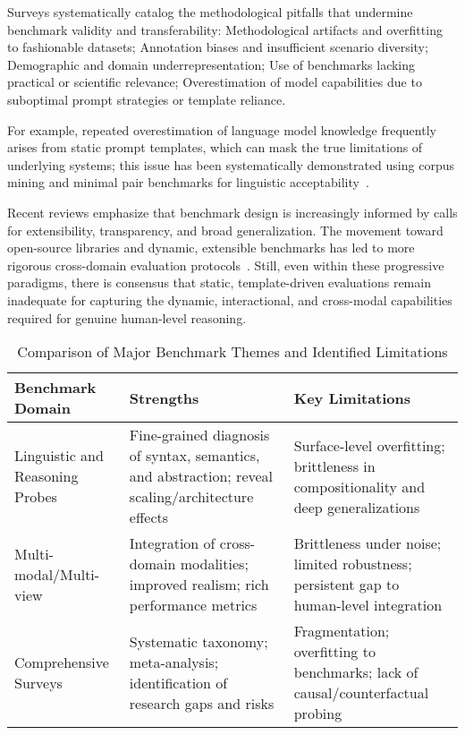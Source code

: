 \documentclass[sigconf]{acmart}
\begin{document}
Surveys systematically catalog the methodological pitfalls that undermine benchmark validity and transferability:
Methodological artifacts and overfitting to fashionable datasets;
Annotation biases and insufficient scenario diversity;
Demographic and domain underrepresentation;
Use of benchmarks lacking practical or scientific relevance;
Overestimation of model capabilities due to suboptimal prompt strategies or template reliance.

For example, repeated overestimation of language model knowledge frequently arises from static prompt templates, which can mask the true limitations of underlying systems; this issue has been systematically demonstrated using corpus mining and minimal pair benchmarks for linguistic acceptability~\cite{ref98, ref99}.

Recent reviews emphasize that benchmark design is increasingly informed by calls for extensibility, transparency, and broad generalization. The movement toward open-source libraries and dynamic, extensible benchmarks has led to more rigorous cross-domain evaluation protocols~\cite{ref5, ref15, ref20, ref23, ref31, ref36, ref37, ref55, ref61, ref62, ref63, ref64, ref74, ref75, ref80, ref86, ref87, ref89}. Still, even within these progressive paradigms, there is consensus that static, template-driven evaluations remain inadequate for capturing the dynamic, interactional, and cross-modal capabilities required for genuine human-level reasoning.

\begin{table*}[htbp]
  \centering
  \caption{Comparison of Major Benchmark Themes and Identified Limitations}
  \label{tab:benchmark_summary}
  \begin{adjustbox}{max width=\textwidth}
  \begin{tabular}{lll}
    \toprule
    \textbf{Benchmark Domain} & \textbf{Strengths} & \textbf{Key Limitations} \\
    \midrule
    Linguistic and Reasoning Probes & Fine-grained diagnosis of syntax, semantics, and abstraction; reveal scaling/architecture effects & Surface-level overfitting; brittleness in compositionality and deep generalizations \\
    Multi-modal/Multi-view & Integration of cross-domain modalities; improved realism; rich performance metrics & Brittleness under noise; limited robustness; persistent gap to human-level integration \\
    Comprehensive Surveys & Systematic taxonomy; meta-analysis; identification of research gaps and risks & Fragmentation; overfitting to benchmarks; lack of causal/counterfactual probing \\
    \bottomrule
  \end{tabular}
  \end{adjustbox}
\end{table*}
\end{document}
